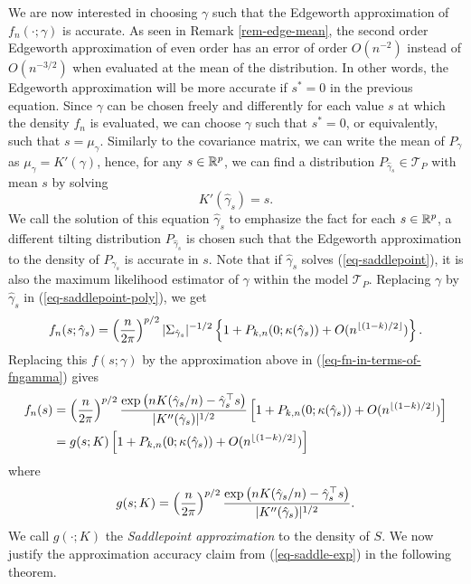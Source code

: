 We are now interested in choosing $\gamma$ such that the Edgeworth approximation of $f_n(\cdot; \gamma)$ is accurate. As seen in Remark \ref{rem-edge-mean}, the second order Edgeworth approximation of even order has an error of order $O(n^{-2})$ instead of $O(n^{-3/2})$ when evaluated at the mean of the distribution. In other words, the Edgeworth approximation will be more accurate if $s^* = 0$ in the previous equation. Since $\gamma$ can be chosen freely and differently for each value $s$ at which the density $f_n$ is evaluated, we can choose $\gamma$ such that $s^* = 0$, or equivalently, such that $s = \mu_\gamma$. Similarly to the covariance matrix, we can write the mean of $P_\gamma$ as $\mu_\gamma = K'(\gamma)$, hence, for any $s \in {\mathbb{R}^p}$, we can find a distribution $P_{\hat\gamma_s} \in \mathcal{T}_P$ with mean $s$ by solving
\begin{equation} \label{eq-saddlepoint}
    K'(\hat\gamma_s) = s.
\end{equation}
We call the solution of this equation $\hat\gamma_s$ to emphasize the fact for each $s \in {\mathbb{R}^p}$, a different tilting distribution $P_{\hat\gamma_s}$ is chosen such that the Edgeworth approximation to the density of $P_{\hat\gamma_s}$ is accurate in $s$. Note that if $\hat\gamma_s$ solves (\ref{eq-saddlepoint}), it is also the maximum likelihood estimator of $\gamma$ within the model $\mathcal{T}_P$. Replacing $\gamma$ by $\hat\gamma_{s}$ in (\ref{eq-saddlepoint-poly}), we get
\begin{equation*}
    f_n(s; \hat\gamma_s) = \left(\frac{n}{2\pi}\right)^{p/2}|\Sigma_{\hat\gamma_s}|^{-1/2}\left\{ 1 + P_{k, n}(0; \kappa(\hat\gamma_s)) + O(n^{\lfloor(1-k)/2\rfloor})\right\}.
\end{equation*}
Replacing this $f(s; \gamma)$ by the approximation above in (\ref{eq-fn-in-terms-of-fngamma}) gives
\begin{align}
    f_n(s) &= \left(\frac{n}{2\pi}\right)^{p/2} \frac{\exp\left(nK(\hat\gamma_s / n) - \hat\gamma_s^\top s\right)}{|K''(\hat\gamma_s)|^{1/2}}  \left[1 + P_{k, n}(0; \kappa(\hat\gamma_s)) + O(n^{\lfloor(1-k)/2\rfloor})\right]\nonumber\\
    &= g(s; K)\left[1 + P_{k, n}(0; \kappa(\hat\gamma_s)) + O(n^{\lfloor(1-k)/2\rfloor})\right] \label{eq-saddle-exp}
\end{align}
where
\begin{equation*}
    g(s; K) = \left(\frac{n}{2\pi}\right)^{p/2} \frac{\exp\left(nK(\hat\gamma_s / n) - \hat\gamma_s^\top s\right)}{|K''(\hat\gamma_s)|^{1/2}}.
\end{equation*}
We call $g(\cdot; K)$ the \textit{Saddlepoint approximation} to the density of $S$. We now justify the approximation accuracy claim from (\ref{eq-saddle-exp}) in the following theorem.

